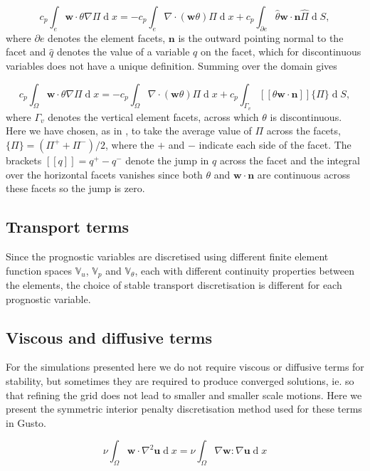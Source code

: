 \documentclass[journal abbreviation, manuscript]{copernicus}
\def\MM#1{\boldsymbol{#1}}
\DeclareMathOperator{\diff}{d}
\newcommand{\avg}[1]{\{#1\}}
\newcommand{\jump}[1]{[\![#1]\!]}
\begin{document}
\begin{equation}
  c_p\int_e\MM{w}\cdot\theta\nabla\Pi\diff x = -c_p\int_e\nabla\cdot(\MM{w}\theta)\Pi\diff x + c_p\int_{\partial e}\hat{\theta}\MM{w}\cdot\MM{n}\hat{\Pi}\diff S,
\end{equation}
where $\partial e$ denotes the element facets, $\MM{n}$ is the outward
pointing normal to the facet and $\hat{q}$ denotes the value of a
variable $q$ on the facet, which for discontinuous variables does not
have a unique definition. Summing over the domain gives

\begin{equation}
  c_p\int_\Omega\MM{w}\cdot\theta\nabla\Pi\diff x = -c_p\int_\Omega\nabla\cdot(\MM{w}\theta)\Pi\diff x + c_p\int_{\Gamma_v}\jump{\theta\MM{w}\cdot\MM{n}}\avg{\Pi} \diff S,
\end{equation}
where $\Gamma_v$ denotes the vertical element facets, across which
$\theta$ is discontinuous. Here we have chosen, as in \citet{}, to take
the average value of $\Pi$ across the facets, $\avg{\Pi} =
(\Pi^++\Pi^-)/2$, where the $+$ and $-$ indicate each side of the
facet. The brackets $\jump{q} = q^+-q^-$ denote the jump in $q$
across the facet and the integral over the horizontal facets vanishes
since both $\theta$ and $\MM{w}\cdot\MM{n}$ are continuous across
these facets so the jump is zero.

\subsection{Transport terms}
Since the prognostic variables are discretised using different finite
element function spaces $\mathbb{V}_u$, $\mathbb{V}_p$ and
$\mathbb{V}_\theta$, each with different continuity properties between
the elements, the choice of stable transport discretisation is
different for each prognostic variable. 


\subsection{Viscous and diffusive terms}

For the simulations presented here we do not require viscous or
diffusive terms for stability, but sometimes they are required to
produce converged solutions, ie. so that refining the grid does not
lead to smaller and smaller scale motions. Here we present the symmetric
interior penalty discretisation method used for these terms in Gusto.

\begin{equation}
  \nu\int_\Omega\MM{w}\cdot\nabla^2\MM{u}\diff x = \nu\int_\Omega\nabla\MM{w}:\nabla\MM{u}\diff x
\end{equation}
\end{document}
